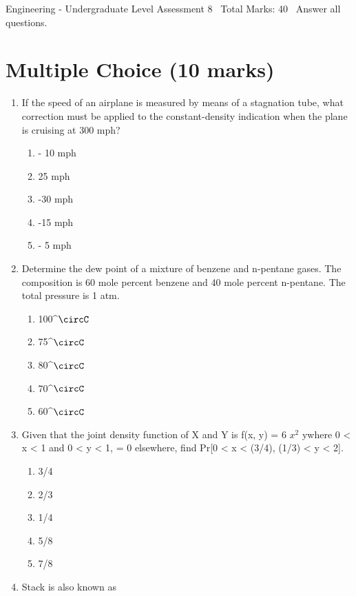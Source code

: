 \documentclass[12pt]{article}
\begin{document}
\begin{center}
Engineering - Undergraduate Level Assessment 8 \
Total Marks: 40 \
Answer all questions.
\end{center}

\section*{Multiple Choice (10 marks)}
\begin{enumerate}[label=\arabic*.]
\item If the speed of an airplane is measured by means of a stagnation tube, what correction must be applied to the constant-density indication when the plane is cruising at 300 mph?
\begin{enumerate}[label=(\alph*)]
    \item - 10 mph
    \item 25 mph
    \item -30 mph
    \item -15 mph
    \item - 5 mph
\end{enumerate}
\item Determine the dew point of a mixture of benzene and n-pentane gases. The composition is 60 mole percent benzene and 40 mole percent n-pentane. The total pressure is 1 atm.
\begin{enumerate}[label=(\alph*)]
    \item 100^\ensuremath{\circC}
    \item 75^\ensuremath{\circC}
    \item 80^\ensuremath{\circC}
    \item 70^\ensuremath{\circC}
    \item 60^\ensuremath{\circC}
\end{enumerate}
\item Given that the joint density function of X and Y is f(x, y) = 6 $x^2$ ywhere 0 \textless{} x \textless{} 1 and 0 \textless{} y \textless{} 1, = 0 elsewhere, find Pr[0 \textless{} x \textless{} (3/4), (1/3) \textless{} y \textless{} 2].
\begin{enumerate}[label=(\alph*)]
    \item 3/4
    \item 2/3
    \item 1/4
    \item 5/8
    \item 7/8
\end{enumerate}
\item Stack is also known as

\end{enumerate}
\end{document}
